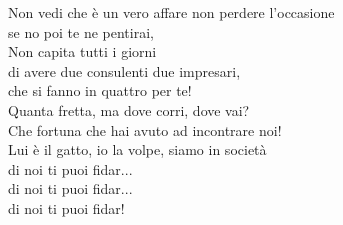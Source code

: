\documentclass[10pt, twoside, a4paper]{article}
\begin{document}
\begin{multicols}{2}
Non vedi che è un vero affare non perdere l'occasione \\
se no poi te ne pentirai, \\
Non capita tutti i giorni \\
di avere due consulenti due impresari, \\
che si fanno in quattro per te! \\

Quanta fretta, ma dove corri, dove vai? \\
Che fortuna che hai avuto ad incontrare noi! \\
Lui è il gatto, io la volpe, siamo in società \\
di noi ti puoi fidar...\\
di noi ti puoi fidar...\\
di noi ti puoi fidar!

\end{multicols}
\end{document}
